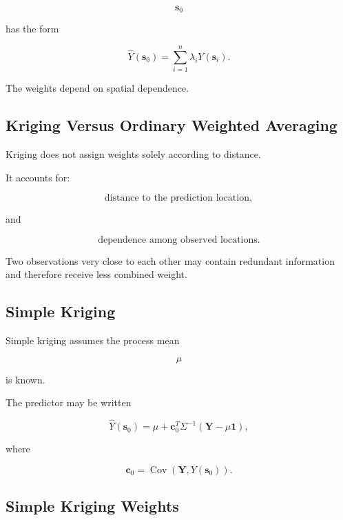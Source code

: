 \[
\mathbf{s}_0
\]

has the form

\[
\boxed{
\widehat{Y}
(
\mathbf{s}_0
)
=
\sum_{i=1}^{n}
\lambda_i
Y
(
\mathbf{s}_i
).
}
\]

The weights depend on spatial dependence.

\subsection{Kriging Versus Ordinary Weighted Averaging}
\label{subsec:kriging-versus-weighting}

Kriging does not assign weights solely according to distance.

It accounts for:

\[
\boxed{
\text{distance to the prediction location},
}
\]

and

\[
\boxed{
\text{dependence among observed locations}.
}
\]

Two observations very close to each other may contain redundant
information and therefore receive less combined weight.

\subsection{Simple Kriging}
\label{subsec:simple-kriging}

Simple kriging assumes the process mean

\[
\mu
\]

is known.

The predictor may be written

\[
\boxed{
\widehat{Y}(\mathbf{s}_0)
=
\mu
+
\mathbf{c}_0^T
\Sigma^{-1}
(
\mathbf{Y}
-
\mu\mathbf{1}
),
}
\]

where

\[
\mathbf{c}_0
=
\operatorname{Cov}
(
\mathbf{Y},
Y(\mathbf{s}_0)
).
\]

\subsection{Simple Kriging Weights}
\label{subsec:simple-kriging-weights}

